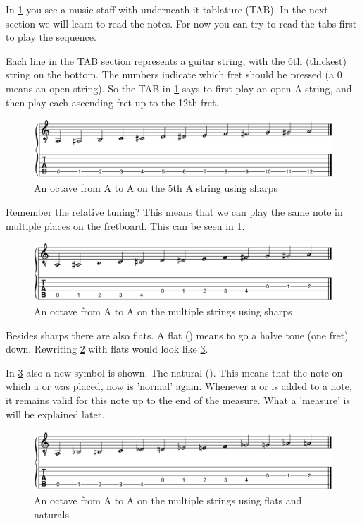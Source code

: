 In \ref{fig:guitar_string_a_octave_single_string_sharps} you see a music staff with underneath it tablature (TAB). In the next section we will learn to read the notes. For now you can try to read the tabs first to play the sequence.

Each line in the TAB section represents a guitar string, with the 6th (thickest) string on the bottom. The numbers indicate which fret should be pressed (a 0 means an open string). So the TAB in \ref{fig:guitar_string_a_octave_single_string_sharps} says to first play an open A string, and then play each ascending fret up to the 12th fret.

\begin{figure}[h]
    \centering
    \includegraphics[width=\textwidth]{../../MuseScore/Guitar/PitchesSharpsSingleString.png}
    \caption{An octave from A to A on the 5th A string using sharps}
    \label{fig:guitar_string_a_octave_single_string_sharps}
\end{figure}

Remember the relative tuning? This means that we can play the same note in multiple places on the fretboard. This can be seen in \ref{fig:guitar_string_a_octave_single_string_sharps}.

\begin{figure}[h]
	\centering
	\includegraphics[width=\textwidth]{../../MuseScore/Guitar/PitchesSharpsMultiString.png}
	\caption{An octave from A to A on the multiple strings using sharps}
	\label{fig:guitar_string_a_octave_multi_string_sharps}
\end{figure}

Besides sharps there are also flats. A flat (\flat) means to go a halve tone (one fret) down. Rewriting \ref{fig:guitar_string_a_octave_multi_string_sharps} with flats would look like \ref{fig:guitar_string_a_octave_multi_string_flats}.

In \ref{fig:guitar_string_a_octave_multi_string_flats} also a new symbol is shown. The natural (\natural). This means that the note on which a \flat or \sharp was placed, now is 'normal' again. Whenever a \flat or \sharp is added to a note, it remains valid for this note up to the end of the measure. What a 'measure' is will be explained later.

\begin{figure}[h]
	\centering
	\includegraphics[width=\textwidth]{../../MuseScore/Guitar/PitchesFlatsMultiString.png}
	\caption{An octave from A to A on the multiple strings using flats and naturals}
	\label{fig:guitar_string_a_octave_multi_string_flats}
\end{figure}